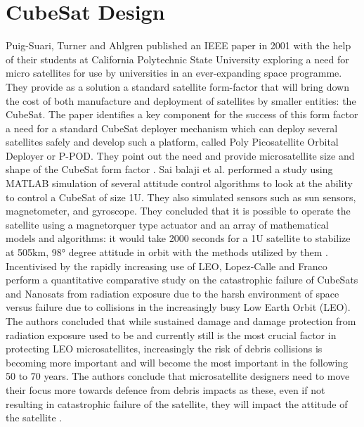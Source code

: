 \section{CubeSat Design}
Puig-Suari, Turner and Ahlgren published an IEEE paper in 2001 with the help of their students at California Polytechnic State University exploring a need for micro satellites for use by universities in an ever-expanding space programme. They provide as a solution a standard satellite form-factor that will bring down the cost of both manufacture and deployment of satellites by smaller entities: the CubeSat. The paper identifies a key component for the success of this form factor a need for a standard CubeSat deployer mechanism which can deploy several satellites safely and develop such a platform, called Poly Picosatellite Orbital Deployer or P-POD. They point out the need and provide microsatellite size and shape of the CubeSat form factor \cite{Puig-Suari2001}.
Sai balaji et al. performed a study using MATLAB simulation of several attitude control algorithms to look at the ability to control a CubeSat of size 1U. They also simulated sensors such as sun sensors, magnetometer, and gyroscope. They concluded that it is possible to operate the satellite using a magnetorquer type actuator and an array of mathematical models and algorithms: it would take 2000 seconds for a 1U satellite to stabilize at 505km, 98° degree attitude in orbit with the methods utilized by them \cite{Balaji2023}.
Incentivised by the rapidly increasing use of LEO, Lopez‑Calle and Franco perform a quantitative comparative study on the catastrophic failure of CubeSats and Nanosats from radiation exposure due to the harsh environment of space versus failure due to collisions in the increasingly busy Low Earth Orbit (LEO). The authors concluded that while sustained damage and damage protection from radiation exposure used to be and currently still is the most crucial factor in protecting LEO microsatellites, increasingly the risk of debris collisions is becoming more important and will become the most important in the following 50 to 70 years. The authors conclude that microsatellite designers need to move their focus more towards defence from debris impacts as these, even if not resulting in catastrophic failure of the satellite, they will impact the attitude of the satellite \cite{Lopez-Calle2023}.